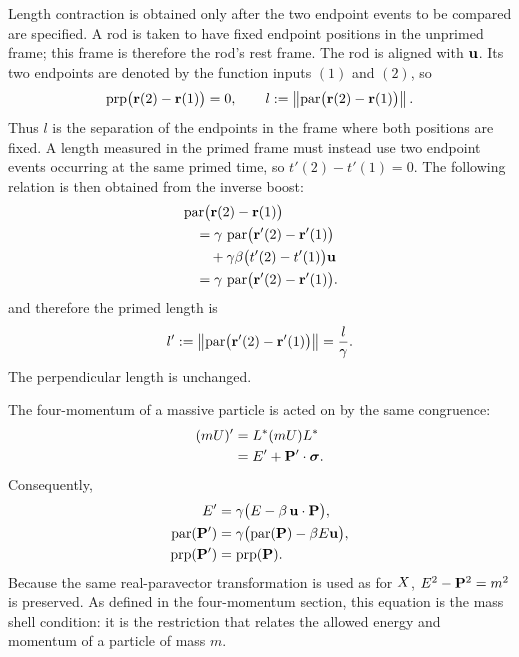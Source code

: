 Length contraction is obtained only after the two endpoint events to be
compared are specified. A rod is taken to have fixed endpoint positions in
the unprimed frame; this frame is therefore the rod's rest frame. The rod is
aligned with \(\mathbf{u}\). Its two endpoints are denoted by the function
inputs \((1)\) and \((2)\), so
\[
\operatorname{prp}\bigl(\mathbf{r}(2)-\mathbf{r}(1)\bigr)=0,
\qquad
l:=\left\|\operatorname{par}\bigl(\mathbf{r}(2)-\mathbf{r}(1)\bigr)\right\|.
\]
Thus \(l\) is the separation of the endpoints in the frame where both
positions are fixed. A length measured in the primed frame must instead use
two endpoint events occurring at the same primed time, so
\(t'(2)-t'(1)=0\). The following relation is then obtained from the inverse
boost:
\begin{equation*}
\begin{aligned}
&\operatorname{par}\bigl(\mathbf{r}(2)-\mathbf{r}(1)\bigr)\\
&\quad=\gamma\,
\operatorname{par}\bigl(\mathbf{r}'(2)-\mathbf{r}'(1)\bigr)\\
&\qquad+\gamma\beta\bigl(t'(2)-t'(1)\bigr)\mathbf{u}\\
&\quad=\gamma\,
\operatorname{par}\bigl(\mathbf{r}'(2)-\mathbf{r}'(1)\bigr).
\end{aligned}
\end{equation*}
and therefore the primed length is
\begin{equation*}
l':=\left\|\operatorname{par}\bigl(\mathbf{r}'(2)-\mathbf{r}'(1)\bigr)\right\|
=\frac{l}{\gamma}.
\end{equation*}
The perpendicular length is unchanged.

The four-momentum of a massive particle is acted on by the same congruence:
\begin{align*}
(mU)'&=L^*(mU)L^*\notag\\
&=E'+\mathbf{P}'\cdot\mathbf{\bm{\sigma}}.
\end{align*}
Consequently,
\begin{align*}
E'&=\gamma\bigl(E-\beta\,\mathbf{u}\cdot\mathbf{P}\bigr),\\
\operatorname{par}(\mathbf{P}')
&=\gamma\bigl(\operatorname{par}(\mathbf{P})-\beta E\mathbf{u}\bigr),\\
\operatorname{prp}(\mathbf{P}')&=\operatorname{prp}(\mathbf{P}).
\end{align*}
Because the same real-paravector transformation is used as for \(X\),
\(E^2-\mathbf{P}^2=m^2\) is preserved. As defined in the four-momentum
section, this equation is the mass shell condition: it is the restriction
that relates the allowed energy and momentum of a particle of mass \(m\).

